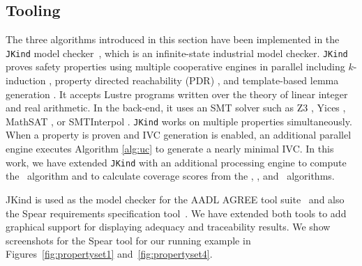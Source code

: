 \subsection{Tooling}

The three algorithms introduced in this section have been implemented in the \texttt{JKind} model checker~\cite{jkind}, which is an infinite-state industrial model checker. \texttt{JKind} proves safety properties using multiple cooperative engines in parallel including $k$-induction \cite{SheeranSS00}, property directed reachability (PDR) \cite{Een2011:PDR}, and template-based lemma generation \cite{Kahsai2011}. It accepts
Lustre programs written over the theory of linear integer and real
arithmetic. In the back-end, it uses an SMT solver such as
Z3 \cite{DeMoura08:z3}, Yices \cite{Dutertre06:yices},
MathSAT \cite{Cimatti2013:MathSAT}, or SMTInterpol \cite{Christ2012:SMTInterpol}.
\texttt{JKind} works on multiple properties simultaneously. When a
property is proven and IVC generation is enabled, an additional
parallel engine executes Algorithm \ref{alg:uc} to generate a nearly minimal
IVC.
In this work, we have extended \texttt{JKind} with an additional processing engine to compute the \mustalg\ algorithm and to calculate coverage scores from the \ucalg, \ucbfalg, and \mustalg\ algorithms.

JKind is used as the model checker for the AADL AGREE tool suite~\cite{NFM2012:CoGaMiWhLaLu} and also the Spear requirements specification tool~\cite{Spear}.  We have extended both tools to add graphical support for displaying adequacy and traceability results.  We show screenshots for the Spear tool for our running example in Figures~\ref{fig:propertyset1} and~\ref{fig:propertyset4}.



